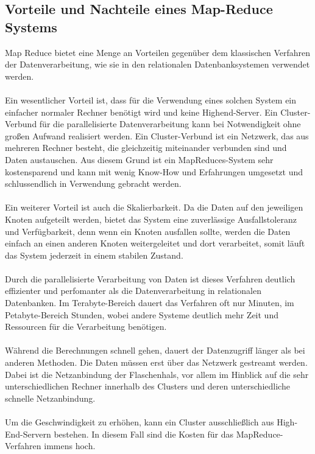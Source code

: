 \documentclass[a4paper,12pt]{article}
\begin{document}
\subsection{Vorteile und Nachteile eines Map-Reduce Systems}
Map Reduce bietet eine Menge an Vorteilen gegenüber dem klassischen Verfahren der Datenverarbeitung, wie
sie in den relationalen Datenbanksystemen verwendet werden. \\ \\
Ein wesentlicher Vorteil ist, dass für die
Verwendung eines solchen System ein einfacher normaler Rechner benötigt wird und keine Highend-Server. Ein Cluster-Verbund für die parallelisierte
Datenverarbeitung kann bei Notwendigkeit ohne großen Aufwand realisiert werden. Ein Cluster-Verbund ist ein Netzwerk, das aus mehreren Rechner besteht, die gleichzeitig miteinander verbunden sind 
und Daten austauschen. Aus diesem Grund ist ein MapReduces-System sehr kostensparend und kann mit wenig Know-How und Erfahrungen umgesetzt und
schlussendlich in Verwendung gebracht werden. \\ \\
Ein weiterer Vorteil ist auch die Skalierbarkeit. Da die Daten auf den jeweiligen Knoten
aufgeteilt werden, bietet das System eine zuverlässige Ausfallstoleranz und Verfügbarkeit, denn wenn ein Knoten ausfallen sollte, werden die Daten einfach an einen
anderen Knoten weitergeleitet und dort verarbeitet, somit läuft das System jederzeit in einem stabilen Zustand. \\ \\
Durch die parallelisierte Verarbeitung von Daten ist dieses Verfahren deutlich effizienter und perfomanter als die Datenverarbeitung
in relationalen Datenbanken. Im Terabyte-Bereich dauert das Verfahren oft nur Minuten, im Petabyte-Bereich Stunden, wobei andere Systeme deutlich mehr Zeit und Ressourcen für die Verarbeitung
benötigen.\\ \\
Während die Berechnungen schnell gehen, dauert der Datenzugriff länger als bei anderen Methoden. 
Die Daten müssen erst über das Netzwerk gestreamt werden. Dabei ist die Netzanbindung der Flaschenhals, vor allem im Hinblick auf die sehr unterschiedlichen Rechner innerhalb des Clusters und deren unterschiedliche schnelle Netzanbindung.\\ \\
Um die Geschwindigkeit zu erhöhen, kann ein Cluster ausschließlich aus High-End-Servern bestehen. In diesem Fall sind die Kosten für das MapReduce-Verfahren immens hoch.
\cite{vorteil/nachteilemrsystem}
\newpage
\noindent
\end{document}
